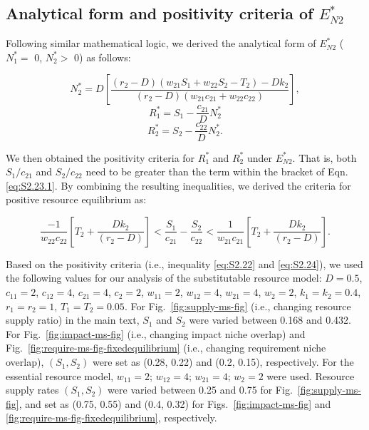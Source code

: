 \subsection{Analytical form and positivity criteria of $E_{N2}^{*}$} 
Following similar mathematical logic, we derived the analytical form of $E_{N2}^{*}$ ($N_{1}^{*} =$  0, $N_{2}^{*} >$ 0) as follows:

\begin{equation}
N_{2}^{*} = D\left [\frac{\left ( r_2 - D\right )\left ( w_{21}S_{1}+w_{22}S_{2}-T_{2} \right )-Dk_{2}}{\left ( r_2-D \right )\left (  w_{21}c_{21}+w_{22}c_{22} \right )}\right],
\tag{S2.23.1}\label{eq:S2.23.1}
\end{equation}
\begin{equation}
R_{1}^{*} = S_1-\frac{c_{21}}{D}N_{2}^{*}
\tag{S2.23.2}\label{eq:S2.23.2}
\end{equation}
\begin{equation}
R_{2}^{*} = S_2-\frac{c_{22}}{D}N_{2}^{*}.
\tag{S2.23.3}\label{eq:S2.23.3}
\end{equation}

\noindent We then obtained the positivity criteria for $R_{1}^{*}$ and $R_{2}^{*}$ under $E_{N2}^{*}$. That is, both $S_1/c_{21}$ and $S_2/c_{22}$ need to be greater than the term within the bracket of Eqn.\ref{eq:S2.23.1}. By combining the resulting inequalities, we derived the criteria for positive resource equilibrium as:

\begin{equation}
\frac{-1}{w_{22}c_{22}}\left [ T_{2} + \frac{Dk_{2}}{\left ( r_{2}-D \right )}\right ] < \frac{S_1}{c_{21}}-\frac{S_2}{c_{22}} < \frac{1}{w_{21}c_{21}}\left [ T_{2} + \frac{Dk_{2}}{\left ( r_{2}-D \right )}\right ].
\tag{S2.24}\label{eq:S2.24}
\end{equation}

Based on the positivity criteria (i.e., inequality \ref{eq:S2.22} and \ref{eq:S2.24}), we used the following values for our analysis of the substitutable resource model: $D=0.5$, $c_{11}=2$, $c_{12}=4$, $c_{21}=4$, $c_{2}=2$, $w_{11}=2$, $w_{12}=4$, $w_{21}=4$, $w_{2}=2$, $k_{1}=k_{2}=0.4$, $r_{1}=r_{2}=1$, $T_{1}=T_{2}=0.05$. For Fig.~\ref{fig:supply-ms-fig} (i.e., changing resource supply ratio) in the main text, $S_1$ and $S_2$ were varied between 0.168 and 0.432. For Fig.~\ref{fig:impact-ms-fig} (i.e., changing impact niche overlap) and Fig.~\ref{fig:require-ms-fig-fixedequilibrium} (i.e., changing requirement niche overlap), $\left ( S_{1}, S_{2} \right )$ were set as (0.28, 0.22) and (0.2, 0.15), respectively. For the essential resource model, $w_{11}=2$; $w_{12}=4$; $w_{21}=4$; $w_{2}=2$ were used. Resource supply rates $\left ( S_{1}, S_{2} \right )$ were varied between 0.25 and 0.75 for Fig.~\ref{fig:supply-ms-fig}, and set as (0.75, 0.55) and (0.4, 0.32) for Figs.~\ref{fig:impact-ms-fig} and \ref{fig:require-ms-fig-fixedequilibrium}, respectively. 



